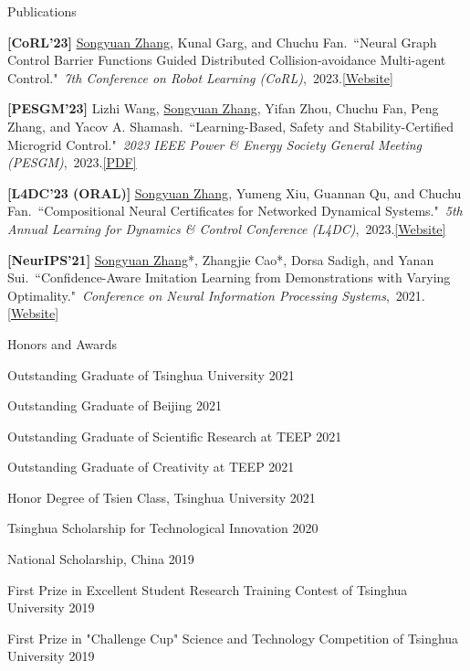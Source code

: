 \documentclass{resume} %
\newcommand{\paperItem}[4]{#1.~``#2."~\textit{#3},~#4.}%
\newcommand{\me}{\underline{Songyuan Zhang}}
\newcommand{\meshort}{\textbf{S. Zhang}}
\newcommand{\person}[2]{#1}
\begin{document}
\begin{rSection}{Publications}
{			\item {\bf [CoRL'23]}
			\paperItem{\person{\me}{\meshort}, \person{Kunal Garg}{K. Garg}, and \person{Chuchu Fan}{C. Fan}}{Neural Graph Control Barrier Functions Guided Distributed Collision-avoidance Multi-agent Control}{7th Conference on Robot Learning (CoRL)}{2023}{\href{https://mit-realm.github.io/gcbf-website/}{[Website]}}
			\item {\bf [PESGM'23]}
			\paperItem{\person{Lizhi Wang}{L. Wang}, \person{\me}{\meshort}, \person{Yifan Zhou}{Y. Zhou}, \person{Chuchu Fan}{C. Fan}, \person{Peng Zhang}{P. Zhang}, and \person{Yacov A. Shamash}{YA. Shamash}}{Learning-Based, Safety and Stability-Certified Microgrid Control}{2023 IEEE Power \& Energy Society General Meeting (PESGM)}{2023}{\href{https://ieeexplore.ieee.org/stamp/stamp.jsp?arnumber=10253396}{[PDF]}}
			\item {\bf [L4DC'23 (ORAL)]}
			\paperItem{\person{\me}{\meshort}, \person{Yumeng Xiu}{Y. Xiu}, \person{Guannan Qu}{G. Qu}, and \person{Chuchu Fan}{C. Fan}}{Compositional Neural Certificates for Networked Dynamical Systems}{5th Annual Learning for Dynamics \& Control Conference (L4DC)}{2023}{\href{https://mit-realm.github.io/neuriss-website/}{[Website]}}
			\item {\bf [NeurIPS'21]}
			\paperItem{\person{\me*}{\meshort}, \person{Zhangjie Cao*}{Z. Cao}, \person{Dorsa Sadigh}{D. Sadigh}, and \person{Yanan Sui}{Y. Sui}}{Confidence-Aware Imitation Learning from Demonstrations with Varying Optimality}{Conference on Neural Information Processing Systems}{2021}{\href{https://sites.google.com/view/cail/}{[Website]}}
		}
	\end{rSection}

	\begin{rSection}{Honors and Awards} {} \itemsep -2pt {}  
		\item Outstanding Graduate of Tsinghua University \hfill{2021}
		\item Outstanding Graduate of Beijing \hfill{2021}
		\item Outstanding Graduate of Scientific Research at TEEP \hfill{2021}
		\item Outstanding Graduate of Creativity at TEEP \hfill{2021}
		\item Honor Degree of Tsien Class, Tsinghua University \hfill{2021}
		\item Tsinghua Scholarship for Technological Innovation \hfill{2020}
		\item National Scholarship, China \hfill{2019}
		\item First Prize in Excellent Student Research Training Contest of Tsinghua University \hfill{2019}
		\item First Prize in "Challenge Cup" Science and Technology Competition of Tsinghua University \hfill{2019}
	\end{rSection}
\end{document}
